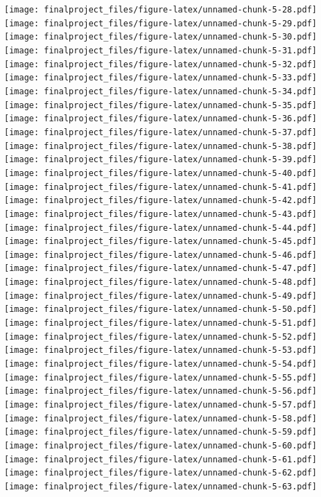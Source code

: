 \documentclass[
]{article}
\begin{document}
\texttt{[image: finalproject\_files/figure-latex/unnamed-chunk-5-28.pdf]}
\texttt{[image: finalproject\_files/figure-latex/unnamed-chunk-5-29.pdf]}
\texttt{[image: finalproject\_files/figure-latex/unnamed-chunk-5-30.pdf]}
\texttt{[image: finalproject\_files/figure-latex/unnamed-chunk-5-31.pdf]}
\texttt{[image: finalproject\_files/figure-latex/unnamed-chunk-5-32.pdf]}
\texttt{[image: finalproject\_files/figure-latex/unnamed-chunk-5-33.pdf]}
\texttt{[image: finalproject\_files/figure-latex/unnamed-chunk-5-34.pdf]}
\texttt{[image: finalproject\_files/figure-latex/unnamed-chunk-5-35.pdf]}
\texttt{[image: finalproject\_files/figure-latex/unnamed-chunk-5-36.pdf]}
\texttt{[image: finalproject\_files/figure-latex/unnamed-chunk-5-37.pdf]}
\texttt{[image: finalproject\_files/figure-latex/unnamed-chunk-5-38.pdf]}
\texttt{[image: finalproject\_files/figure-latex/unnamed-chunk-5-39.pdf]}
\texttt{[image: finalproject\_files/figure-latex/unnamed-chunk-5-40.pdf]}
\texttt{[image: finalproject\_files/figure-latex/unnamed-chunk-5-41.pdf]}
\texttt{[image: finalproject\_files/figure-latex/unnamed-chunk-5-42.pdf]}
\texttt{[image: finalproject\_files/figure-latex/unnamed-chunk-5-43.pdf]}
\texttt{[image: finalproject\_files/figure-latex/unnamed-chunk-5-44.pdf]}
\texttt{[image: finalproject\_files/figure-latex/unnamed-chunk-5-45.pdf]}
\texttt{[image: finalproject\_files/figure-latex/unnamed-chunk-5-46.pdf]}
\texttt{[image: finalproject\_files/figure-latex/unnamed-chunk-5-47.pdf]}
\texttt{[image: finalproject\_files/figure-latex/unnamed-chunk-5-48.pdf]}
\texttt{[image: finalproject\_files/figure-latex/unnamed-chunk-5-49.pdf]}
\texttt{[image: finalproject\_files/figure-latex/unnamed-chunk-5-50.pdf]}
\texttt{[image: finalproject\_files/figure-latex/unnamed-chunk-5-51.pdf]}
\texttt{[image: finalproject\_files/figure-latex/unnamed-chunk-5-52.pdf]}
\texttt{[image: finalproject\_files/figure-latex/unnamed-chunk-5-53.pdf]}
\texttt{[image: finalproject\_files/figure-latex/unnamed-chunk-5-54.pdf]}
\texttt{[image: finalproject\_files/figure-latex/unnamed-chunk-5-55.pdf]}
\texttt{[image: finalproject\_files/figure-latex/unnamed-chunk-5-56.pdf]}
\texttt{[image: finalproject\_files/figure-latex/unnamed-chunk-5-57.pdf]}
\texttt{[image: finalproject\_files/figure-latex/unnamed-chunk-5-58.pdf]}
\texttt{[image: finalproject\_files/figure-latex/unnamed-chunk-5-59.pdf]}
\texttt{[image: finalproject\_files/figure-latex/unnamed-chunk-5-60.pdf]}
\texttt{[image: finalproject\_files/figure-latex/unnamed-chunk-5-61.pdf]}
\texttt{[image: finalproject\_files/figure-latex/unnamed-chunk-5-62.pdf]}
\texttt{[image: finalproject\_files/figure-latex/unnamed-chunk-5-63.pdf]}
\end{document}
